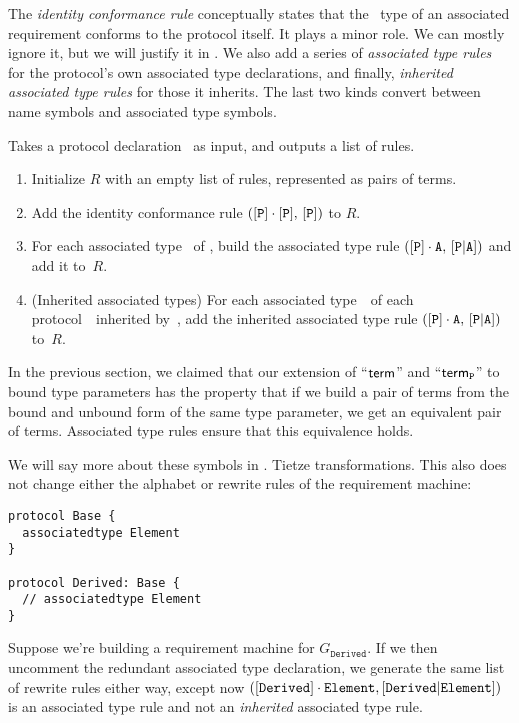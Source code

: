 \documentclass[../generics]{subfiles}
\begin{document}
The \emph{identity conformance rule} conceptually states that the \tSelf\ type of an associated requirement conforms to the protocol itself. It plays a minor role. We can mostly ignore it, but we will justify it in . We also add a series of \emph{associated type rules} for the protocol's own associated type declarations, and finally, \emph{inherited associated type rules} for those it inherits. The last two kinds convert between name symbols and associated type symbols.

\begin{algorithm}\label{rules for protocol algo}
Takes a protocol declaration \tP\ as input, and outputs a list of rules.
\begin{enumerate}
\item Initialize $R$ with an empty list of rules, represented as pairs of terms.
\item Add the identity conformance rule $([\texttt{P}] \cdot [\texttt{P}],\, [\texttt{P}])$ to $R$.
\item For each associated type \nA\ of \tP, build the associated type rule $([\texttt{P}] \cdot \texttt{A},\, [\texttt{P}|\texttt{A}])$ and add it to~$R$.

\item (Inherited associated types) For each associated type~\nA\ of each protocol~\tQ\ inherited by~\tP, add the inherited associated type rule $([\texttt{P}] \cdot \texttt{A},\,[\texttt{P}|\texttt{A}])$ to~$R$.
\end{enumerate}
\end{algorithm}

In the previous section, we claimed that our extension of ``$\mathsf{term}$'' and ``$\mathsf{term}_{\texttt{P}}$'' to bound type parameters has the property that if we build a pair of terms from the bound and unbound form of the same type parameter, we get an equivalent pair of terms. Associated type rules ensure that this equivalence holds.

 We will say more about these symbols in . Tietze transformations.
 This also does not change either the alphabet or rewrite rules of the requirement machine:
\begin{Verbatim}
protocol Base {
  associatedtype Element
}

protocol Derived: Base {
  // associatedtype Element
}
\end{Verbatim}
Suppose we're building a requirement machine for $G_\texttt{Derived}$.
If we then uncomment the redundant associated type declaration, we generate the same list of rewrite rules either way, except now $([\texttt{Derived}]\cdot\texttt{Element}, [\texttt{Derived}|\texttt{Element}])$ is an associated type rule and not an \emph{inherited} associated type rule.
\end{document}
